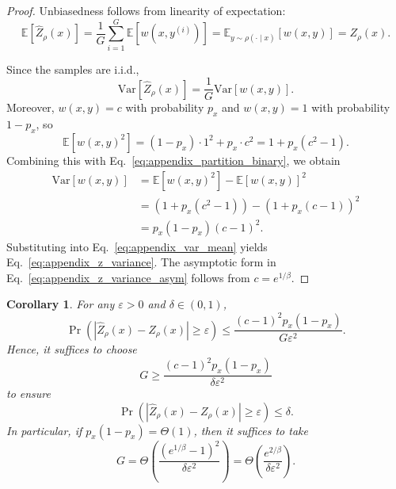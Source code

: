 \documentclass{article}
\newtheorem{corollary}[proposition]{Corollary}
\begin{document}
\begin{proof}
Unbiasedness follows from linearity of expectation:
\begin{equation}
\mathbb{E}[\widehat{Z}_\rho(x)]
=
\frac{1}{G}\sum_{i=1}^G \mathbb{E}[w(x,y^{(i)})]
=
\mathbb{E}_{y \sim \rho(\cdot \mid x)}[w(x,y)]
=
Z_\rho(x).
\end{equation}

Since the samples are i.i.d.,
\begin{equation}
\mathrm{Var}\!\left[\widehat{Z}_\rho(x)\right]
=
\frac{1}{G}\mathrm{Var}[w(x,y)].
\label{eq:appendix_var_mean}
\end{equation}
Moreover, $w(x,y)=c$ with probability $p_x$ and $w(x,y)=1$ with probability $1-p_x$, so
\begin{equation}
\mathbb{E}[w(x,y)^2]
=
(1-p_x)\cdot 1^2 + p_x \cdot c^2
=
1 + p_x(c^2-1).
\end{equation}
Combining this with Eq.~\eqref{eq:appendix_partition_binary}, we obtain
\begin{align}
\mathrm{Var}[w(x,y)]
&=
\mathbb{E}[w(x,y)^2] - \mathbb{E}[w(x,y)]^2 \\
&=
\left(1 + p_x(c^2-1)\right) - \left(1 + p_x(c-1)\right)^2 \\
&=
p_x(1-p_x)(c-1)^2.
\end{align}
Substituting into Eq.~\eqref{eq:appendix_var_mean} yields Eq.~\eqref{eq:appendix_z_variance}. The asymptotic form in Eq.~\eqref{eq:appendix_z_variance_asym} follows from $c=e^{1/\beta}$.
\end{proof}

\begin{corollary}
\label{cor:z_sample_complexity}
For any $\varepsilon > 0$ and $\delta \in (0,1)$,
\begin{equation}
\Pr\!\left(
\left|\widehat{Z}_\rho(x)-Z_\rho(x)\right| \ge \varepsilon
\right)
\le
\frac{(c-1)^2 p_x(1-p_x)}{G \varepsilon^2}.
\label{eq:appendix_chebyshev}
\end{equation}
Hence, it suffices to choose
\begin{equation}
G
\ge
\frac{(c-1)^2 p_x(1-p_x)}{\delta \varepsilon^2}
\label{eq:appendix_sample_complexity}
\end{equation}
to ensure
\begin{equation}
\Pr\!\left(
\left|\widehat{Z}_\rho(x)-Z_\rho(x)\right| \ge \varepsilon
\right)
\le \delta.
\end{equation}
In particular, if $p_x(1-p_x)=\Theta(1)$, then it suffices to take
\begin{equation}
G
=
\Theta\!\left(\frac{(e^{1/\beta}-1)^2}{\delta \varepsilon^2}\right)
=
\Theta\!\left(\frac{e^{2/\beta}}{\delta \varepsilon^2}\right).
\label{eq:appendix_sample_complexity_asym}
\end{equation}
\end{corollary}
\end{document}
